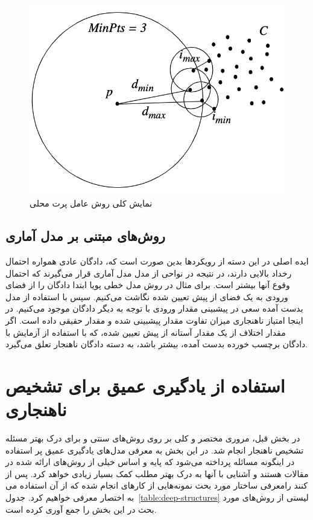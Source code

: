 \documentclass[12pt,a4paper]{report}
\begin{document}
	\begin{figure}[!h]
	\begin{center}
		\includegraphics[width=0.5\linewidth]{./images/figures/lof.png}
	\end{center}
	\caption{نمایش کلی روش عامل پرت محلی~\cite{10.1145/342009.335388}}
	\label{fig:lof}
	\centering
\end{figure}



\subsection{روش‌های مبتنی بر مدل آماری}
ایده اصلی در این دسته از رویکرد‌ها بدین صورت است که، دادگان عادی همواره احتمال رخداد بالایی دارند، در نتیجه در نواحی از مدل مدل آماری قرار می‌گیرند که احتمال وقوع آنها بیشتر است. برای مثال در روش مدل خطی پویا ابتدا دادگان را از فضای ورودی به یک فضای از پیش تعیین شده نگاشت می‌کنیم. سپس با استفاده از مدل بدست آمده سعی در پیشبینی مقدار ورودی با توجه به دیگر دادگان موجود می‌کنیم. در اینجا امتیاز ناهنجاری میزان تفاوت مقدار پیشبینی شده و مقدار حقیقی داده است. اگر مقدار اختلاف از یک مقدار آستانه از پیش تعیین شده، که با استفاده از آزمایش با دادگان برچسب خورده بدست آمده، بیشتر باشد، به دسته دادگان ناهنجار تعلق می‌گیرد.


\section{استفاده از یادگیری عمیق برای تشخیص ناهنجاری}
 در بخش قبل، مروری مختصر و کلی بر روی روش‌های سنتی و برای درک بهتر مسئله تشخیص ناهنجار انجام شد. در این بخش به معرفی مدل‌های یادگیری عمیق پر استفاده در اینگونه مسائله پرداخته می‌شود که پایه و اساس خیلی از روش‌های ارائه شده در مقالات هستند و آشنایی با آنها به درک بهتر مطلب کمک بسیار زیادی خواهد کرد. پس از معرفی ساختار مورد بحث نمونه‌هایی از کار‌های انجام شده که از آن استفاده می‌‎کنند را به اختصار معرفی خواهیم کرد. جدول~\ref{table:deep-structures} لیستی از روش‌های مورد بحث در این بخش را جمع آوری کرده است.
\end{document}
